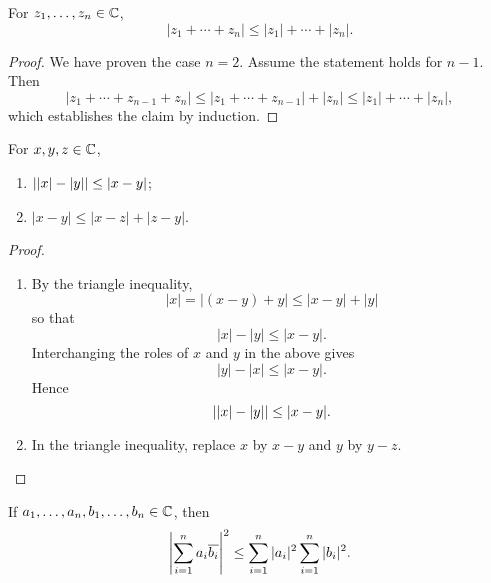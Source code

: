 \begin{corollary}
For $z_1,\dots,z_n\in\mathbb C$,
\[|z_1+\cdots+z_n|\le|z_1|+\cdots+|z_n|.\]
\end{corollary}

\begin{proof}
We have proven the case $n=2$. Assume the statement holds for $n-1$. Then
\[|z_1+\cdots+z_{n-1}+z_n|\le|z_1+\cdots+z_{n-1}|+|z_n|\le|z_1|+\cdots+|z_n|,\]
which establishes the claim by induction.
\end{proof}

\begin{corollary}
For $x,y,z\in\mathbb C$,
\begin{enumerate}[label=(\roman*)]
\item $\left||x|-|y|\right|\le|x-y|$;
\item $|x-y|\le|x-z|+|z-y|$.
\end{enumerate}
\end{corollary}

\begin{proof} \
\begin{enumerate}[label=(\roman*)]
\item By the triangle inequality,
\[|x|=|(x-y)+y|\le|x-y|+|y|\]
so that
\[|x|-|y|\le|x-y|.\]
Interchanging the roles of $x$ and $y$ in the above gives
\[|y|-|x|\le|x-y|.\]
Hence
\[\left||x|-|y|\right|\le|x-y|.\]
\item In the triangle inequality, replace $x$ by $x-y$ and $y$ by $y-z$.
\end{enumerate}
\end{proof}

\begin{proposition}
If $a_1,\dots,a_n,b_1,\dots,b_n\in\mathbb C$, then
\begin{equation}\label{eqn:cauchy-schwarz-inequality}
\left|\sum_{i=1}^{n}a_i\overline{b_i}\right|^2\le\sum_{i=1}^{n}|a_i|^2\sum_{i=1}^{n}|b_i|^2.
\end{equation}
\end{proposition}

